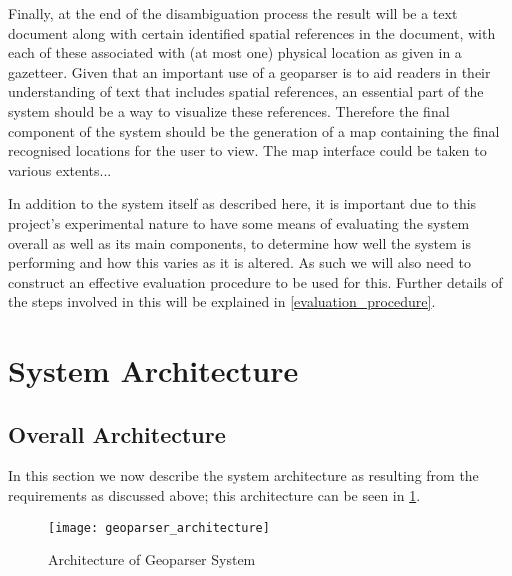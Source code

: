 \documentclass[12pt, a4paper]{report}
\begin{document}
Finally, at the end of the disambiguation process the result will be a text document along with certain identified spatial references in the document, with each of these associated with (at most one) physical location as given in a gazetteer. Given that an important use of a geoparser is to aid readers in their understanding of text that includes spatial references, an essential part of the system should be a way to visualize these references. Therefore the final component of the system should be the generation of a map containing the final recognised locations for the user to view. The map interface could be taken to various extents...
 
In addition to the system itself as described here, it is important due to this project's experimental nature to have some means of evaluating the system overall as well as its main components, to determine how well the system is performing and how this varies as it is altered. As such we will also need to construct an effective evaluation procedure to be used for this. Further details of the steps involved in this will be explained in \ref{evaluation_procedure}. 

\section{System Architecture}


\subsection{Overall Architecture}
\label{overall_architecture}


In this section we now describe the system architecture as resulting from the requirements as discussed above; this architecture can be seen in \ref{fig:geoparser_architecture}.

\begin{figure}[h!]
  \centering
  \texttt{[image: geoparser\_architecture]}
  \caption{Architecture of Geoparser System}
  \label{fig:geoparser_architecture}
\end{figure}
\end{document}
